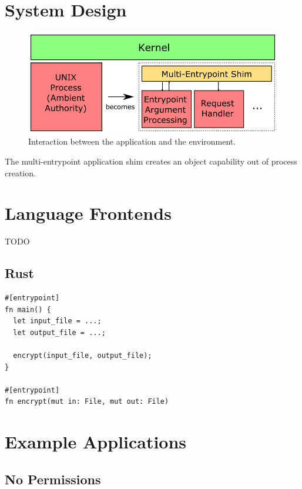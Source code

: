 \documentclass[sigplan]{acmart}
\begin{document}
\section{System Design}

\begin{figure}
    \centering
    \includegraphics[width=\columnwidth]{figures/self-compartmentalisation.png}
    \caption{Interaction between the application and the environment.}
    \label{fig:self-compartmentalisation-interactions}
\end{figure}

The multi-entrypoint application shim creates an object capability out of process creation. 

\section{Language Frontends}

TODO

\subsection{Rust}

\begin{lstlisting}[float]
#[entrypoint]
fn main() {
  let input_file = ...;
  let output_file = ...;
  
  encrypt(input_file, output_file);
}

#[entrypoint]
fn encrypt(mut in: File, mut out: File)
\end{lstlisting}

\section{Example Applications}

\subsection{No Permissions}
\end{document}
